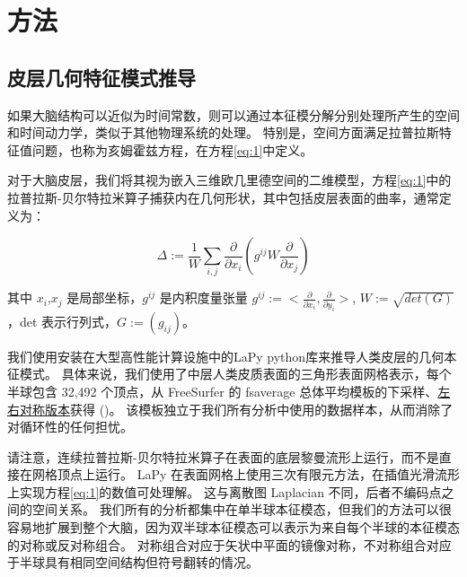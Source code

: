 \documentclass[lang=cn,a4paper,newtx]{elegantpaper}
\begin{document}
\section{方法} \label{sec:method}

\subsection{皮层几何特征模式推导} \label{sec:derivation}

如果大脑结构可以近似为时间常数，则可以通过本征模分解\cite{nowack1995neocortical,robinson2016eigenmodes}分别处理所产生的空间和时间动力学，类似于其他物理系统的处理\cite{melrose1991electromagnetic}。 
特别是，空间方面满足拉普拉斯特征值问题，也称为亥姆霍兹方程，在方程\ref{eq:1}中定义。

对于大脑皮层，我们将其视为嵌入三维欧几里德空间的二维模型，方程\ref{eq:1}中的拉普拉斯-贝尔特拉米算子捕获内在几何形状，其中包括皮层表面的曲率\cite{wachinger2015brainprint}，通常定义为\cite{chavel1984eigenvalues,seo2011laplace}：


\begin{equation}\label{key}
	\Delta:=\frac{1}{W} \sum_{i,j} \frac{\partial}{\partial x_i} (g^{ij} W \frac{\partial}{\partial x_j})
\end{equation}

其中 $ x_i $,$ x_j $ 是局部坐标，$ g^{ij} $ 是内积度量张量 $ g^{ij}:=<\frac{\partial}{\partial x_i}, \frac{\partial}{\partial y_i}> $, $ W:=\sqrt{det(G)} $，det 表示行列式，$ G:=(g_{ij}) $。


我们使用安装在大型高性能计算设施\cite{goscinski2014multi}中的LaPy python库\cite{wachinger2015brainprint,reuter2006laplace}来推导人类皮层的几何本征模式。 
具体来说，我们使用了中层人类皮质表面的三角形表面网格表示，每个半球包含 32,492 个顶点，从 FreeSurfer 的 fsaverage 总体平均模板的下采样、\href{https://github.com/ ThomasYeoLab/CBIG/tree/master/data/templates/surface/fs_LR_32k}{左右对称版本}获得\cite{fischl1999high} ()。
该模板独立于我们所有分析中使用的数据样本，从而消除了对循环性的任何担忧。


请注意，连续拉普拉斯-贝尔特拉米算子在表面的底层黎曼流形上运行，而不是直接在网格顶点上运行。
LaPy 在表面网格上使用三次有限元方法，在插值光滑流形上实现方程\ref{eq:1}的数值可处理解。
这与离散图 Laplacian \cite{shuman2013emerging} 不同，后者不编码点之间的空间关系。
我们所有的分析都集中在单半球本征模态，但我们的方法可以很容易地扩展到整个大脑，因为双半球本征模态可以表示为来自每个半球的本征模态的对称或反对称组合。
对称组合对应于矢状中平面的镜像对称，不对称组合对应于半球具有相同空间结构但符号翻转的情况。
\end{document}
